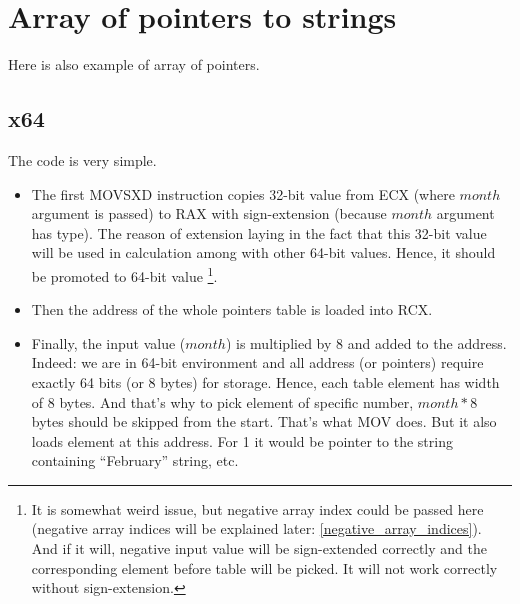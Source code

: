 ﻿%
\ifdefined\RUSSIAN
\else
\section{Array of pointers to strings}
\label{array_of_pointers_to_strings}

Here is also example of array of pointers.



\subsection{x64}

The code is very simple. 

\begin{itemize}

\item
{}
The first MOVSXD instruction copies 32-bit value from ECX (where $month$ argument is passed) 
to RAX with sign-extension (because $month$ argument has \Tint type).
The reason of extension laying in the fact that this 32-bit value will be used in calculation among
with other 64-bit values. 
Hence, it should be promoted to 64-bit value
\footnote{It is somewhat weird issue, but negative array index could be passed here 
(negative array indices will be explained later: \ref{negative_array_indices}). 
And if it will, negative input \Tint value will be sign-extended correctly 
and the corresponding element before table will be picked. 
It will not work correctly without sign-extension.}.

\item
Then the address of the whole pointers table is loaded into RCX.

\item
Finally, the input value ($month$) is multiplied by 8 and added to the address.
Indeed: we are in 64-bit environment and all address (or pointers) require exactly 64 bits (or 8 bytes) 
for storage.
Hence, each table element has width of 8 bytes.
And that's why to pick element of specific number, $month*8$ bytes should be skipped from the start.
That's what MOV does.
But it also loads element at this address.
For 1 it would be pointer to the string containing ``February'' string, etc.

\end{itemize}



